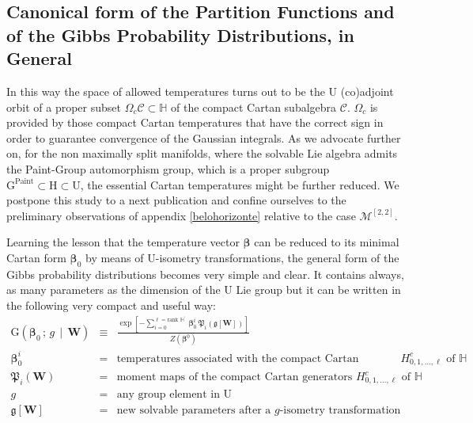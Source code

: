 \documentclass[10pt,a4paper]{article}
\begin{document}
\subsection{Canonical form of the Partition Functions and of the Gibbs Probability Distributions, in General}
In this way the space of allowed temperatures turns out to be the $\mathrm{U}$
(co)adjoint orbit of a proper subset $\Omega_c \mathcal{C}\subset \mathbb{H}$ of the compact Cartan subalgebra $\mathcal{C}$. $\Omega_c$ is provided by those compact Cartan temperatures that have the correct sign in order to guarantee convergence of the Gaussian integrals. As we advocate further on, for the non maximally split manifolds, where the  solvable Lie algebra admits the Paint-Group automorphism group, which is a proper subgroup $\mathrm{G^{Paint}} \subset \mathrm{H}\subset \mathrm{U}$, the essential Cartan temperatures might be further reduced. We postpone this study to a next publication and confine ourselves to the preliminary observations of appendix
\ref{belohorizonte} relative to the case $\mathcal{M}^{[2,2]}$.
\par
Learning the lesson that the temperature vector $\boldsymbol{\beta}$ can be reduced to its minimal Cartan form
$\boldsymbol{\beta}_0$ by means of $\mathrm{U}$-isometry transformations, the general form of the Gibbs probability distributions becomes very simple and clear. It contains always, as many parameters as the dimension of the $\mathrm{U}$ Lie group but it can be written in the following very compact and useful way:
\begin{eqnarray}\label{carbonero}
  \mathrm{G}\left(\boldsymbol{\beta}_0\, ; \,  g \, \mid \, \mathbf{W} \right) & \equiv & \frac{\exp\left[ - \sum_{i=0}^{\ell=\text{rank }\mathbb{H}^\prime} \,\boldsymbol{\beta}_0^{i} \,\boldsymbol{\mathfrak{P}}_i \left(\mathfrak{g}[\mathbf{W}]\right) \right]} {Z(\boldsymbol{\beta}^0)} \nonumber\\
  \boldsymbol{\beta}_0^{i} & = & \text{temperatures associated with the compact Cartan generators $H^c_{0,1,\dots, \ell}$ of $\mathbb{H}$} \nonumber\\
  \boldsymbol{\mathfrak{P}}_i \left(\mathbf{W}\right) &=& \text{moment maps of the compact Cartan generators $H^c_{0,1,\dots, \ell}$ of $\mathbb{H}$} \nonumber\\
  g & = & \text{any group element in $\mathrm{U}$} \nonumber\\
  \mathfrak{g}[\mathbf{W}] & = & \text{new solvable parameters after a $g$-isometry transformation}
  \end{eqnarray}
\end{document}
